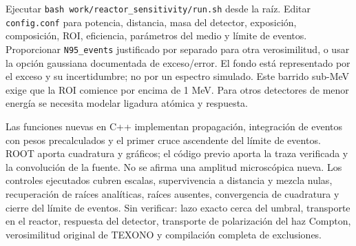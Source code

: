 {Ejecutar \texttt{bash work/reactor\_sensitivity/run.sh} desde la raíz. Editar \texttt{config.conf} para potencia, distancia, masa del detector, exposición, composición, ROI, eficiencia, parámetros del medio y límite de eventos. Proporcionar \texttt{N95\_events} justificado por separado para otra verosimilitud, o usar la opción gaussiana documentada de exceso/error. El fondo está representado por el exceso y su incertidumbre; no por un espectro simulado. Este barrido sub-MeV exige que la ROI comience por encima de 1 MeV. Para otros detectores de menor energía se necesita modelar ligadura atómica y respuesta.}

{Las funciones nuevas en C++ implementan propagación, integración de eventos con pesos precalculados y el primer cruce ascendente del límite de eventos. ROOT aporta cuadratura y gráficos; el código previo aporta la traza verificada y la convolución de la fuente. No se afirma una amplitud microscópica nueva. Los controles ejecutados cubren escalas, supervivencia a distancia y mezcla nulas, recuperación de raíces analíticas, raíces ausentes, convergencia de cuadratura y cierre del límite de eventos. Sin verificar: lazo exacto cerca del umbral, transporte en el reactor, respuesta del detector, transporte de polarización del haz Compton, verosimilitud original de TEXONO y compilación completa de exclusiones.}
